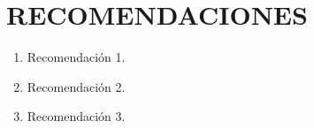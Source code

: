 % 

\chapter{RECOMENDACIONES}
\begin{enumerate}
	\item Recomendación 1.
	\item Recomendación 2.
	\item Recomendación 3.
\end{enumerate}
